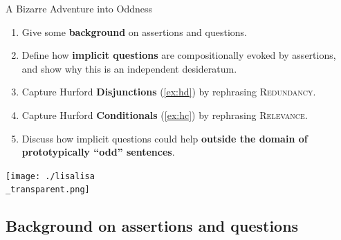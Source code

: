 \documentclass[10pt]{beamer}
\begin{document}
\begin{frame}{A Bizarre Adventure into Oddness}
	\begin{enumerate}
		\item Give some \textbf{background} on assertions and questions.
		\item Define how \textbf{implicit questions} are compositionally evoked by assertions, and show why this is an independent desideratum.
		\item Capture Hurford \textbf{Disjunctions} (\ref{ex:hd}) by rephrasing \textsc{Redundancy}.
		\item Capture Hurford \textbf{Conditionals} (\ref{ex:hc}) by rephrasing \textsc{Relevance}.
		\item Discuss how implicit questions could help \textbf{outside the domain of prototypically ``odd'' sentences}.
	\end{enumerate}
\end{frame}

\usebackgroundtemplate%
{%
	\texttt{[image: ./lisalisa\\\_transparent.png]}%
}
\begin{frame}
	\section[Background on assertions and questions]{Background on assertions and questions}
\end{frame}

\usebackgroundtemplate{}
\end{document}
